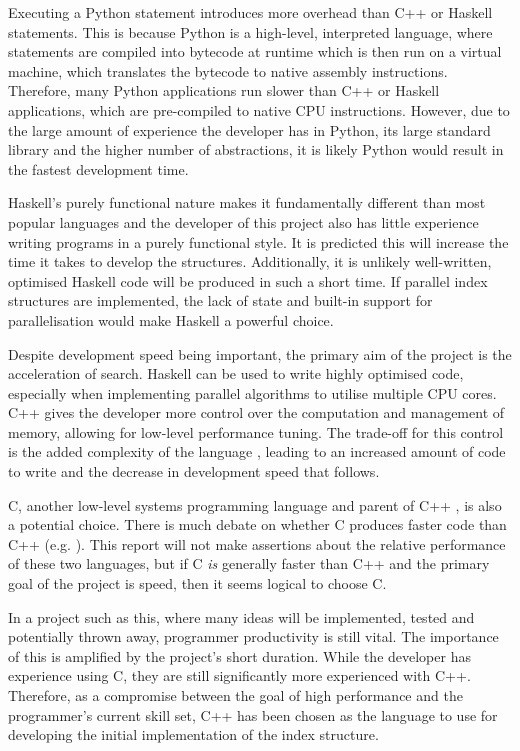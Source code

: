 Executing a Python statement introduces more overhead than C++ or Haskell statements. This is because Python is a high-level, interpreted language, where statements are compiled into bytecode at runtime which is then run on a virtual machine, which translates the bytecode to native assembly instructions. Therefore, many Python applications run slower than C++ or Haskell applications, which are pre-compiled to native CPU instructions. However, due to the large amount of experience the developer has in Python, its large standard library and the higher number of abstractions, it is likely Python would result in the fastest development time. 

Haskell's purely functional nature makes it fundamentally different than most popular languages and the developer of this project also has little experience writing programs in a purely functional style. It is predicted this will increase the time it takes to develop the structures. Additionally, it is unlikely well-written, optimised Haskell code will be produced in such a short time. If parallel index structures are implemented, the lack of state and built-in support for parallelisation \cite{parallel-haskell} would make Haskell a powerful choice.

Despite development speed being important, the primary aim of the project is the acceleration of search. Haskell can be used to write highly optimised code, especially when implementing parallel algorithms to utilise multiple CPU cores. C++ gives the developer more control over the computation and management of memory, allowing for low-level performance tuning. The trade-off for this control is the added complexity of the language \cite{cpp-hard}, leading to an increased amount of code to write and the decrease in development speed that follows.

C, another low-level systems programming language \cite{c-lang} and parent of C++ \cite{cpp}, is also a potential choice. There is much debate on whether C produces faster code than C++ (e.g. \cite{c-vs-cpp1, c-vs-cpp2, c-vs-cpp3}). This report will not make assertions about the relative performance of these two languages, but if C \textit{is} generally faster than C++ and the primary goal of the project is speed, then it seems logical to choose C.

In a project such as this, where many ideas will be implemented, tested and potentially thrown away, programmer productivity is still vital. The importance of this is amplified by the project's short duration. While the developer has experience using C, they are still significantly more experienced with C++. Therefore, as a compromise between the goal of high performance and the programmer's current skill set, C++ has been chosen as the language to use for developing the initial implementation of the index structure. 

